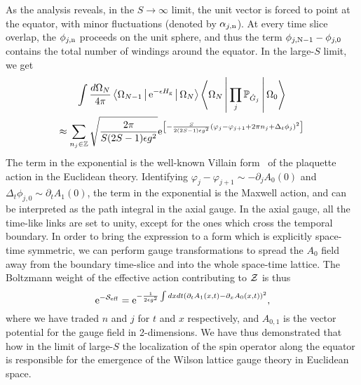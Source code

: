 \documentclass[aps,prl,reprint,twocolumn,superscriptaddress,floatfix,nofootinbib]{revtex4-1}
\begin{document}
As the analysis reveals, in the $S \to \infty$ limit, the unit vector is forced to point at the equator, with minor fluctuations (denoted by $\alpha_{j,{\rm n}}$). At every time slice overlap, the $\phi_{j,{\rm n}}$ proceeds on the unit sphere, and thus the term $\phi_{j,{\rm N-1}} - \phi_{j,0}$ contains the total number of windings around the equator. In the large-$S$ limit, we get
\begin{multline}
	\int \frac{d \Omega_N}{4 \pi} \Braket{\Omega_{N-1}| {\rm e}^{-\epsilon H_{\rm g}} | \Omega_N} \Braket{\Omega_N| \prod_j \mathbb{P}_{\hat{G}_j} | \Omega_0} \\
	\approx \sum_{n_j \in \mathbb{Z}} \sqrt{\frac{2 \pi}{S (2S-1) \epsilon g^2}} 
	{\rm e}^{\left[-\frac{S}{2(2S-1)\epsilon g^2} (\varphi_j - \varphi_{j+1} + 2\pi n_j + \Delta_t \phi_j)^2  \right]}
\end{multline}
The term in the exponential is the well-known Villain form~\cite{Villain1974} of the plaquette action in the Euclidean theory. Identifying $\varphi_{j} - \varphi_{j+1} \sim -\partial_j A_0(0)$ and $\Delta_t \phi_{j,0} \sim \partial_t A_1(0)$, the term in the exponential is the Maxwell action, and can be interpreted as the path integral in the axial gauge. In the axial gauge, all the time-like links are set to unity, except for the ones which cross the temporal boundary. In order to bring the expression to a form which is explicitly space-time symmetric, we can perform gauge transformations to spread the $A_0$ field away from the boundary time-slice and into the whole space-time lattice. The Boltzmann weight of the effective action contributing to ${\cal Z}$ is thus
\begin{equation}
	{\rm e}^{-{\cal S}_{\rm eff}} =  {\rm e}^{- \frac{1}{2 \epsilon g^2} \int dx dt (\partial_t A_1 (x,t) - \partial_x A_0 (x,t) )^2},
\end{equation}
where we have traded $n$ and $j$ for $t$ and $x$ respectively, and $A_{0,1}$ is the vector potential for the gauge field in 2-dimensions. We have thus demonstrated that how in the limit of large-$S$ the localization of the spin operator along the equator is responsible for the emergence of the Wilson lattice gauge theory in Euclidean space.
\end{document}
